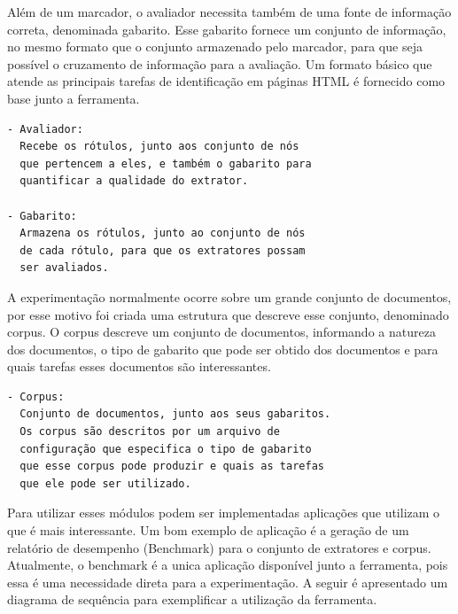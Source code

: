 \documentclass[12pt, a4paper]{article}
\begin{document}

Além de um marcador, o avaliador necessita também de uma fonte de
informação correta, denominada gabarito. Esse gabarito fornece um
conjunto de informação, no mesmo formato que o conjunto armazenado pelo
marcador, para que seja possível o cruzamento de informação para a
avaliação. Um formato básico que atende as principais tarefas de
identificação em páginas HTML é fornecido como base junto a ferramenta.

\begin{verbatim}
- Avaliador:
  Recebe os rótulos, junto aos conjunto de nós
  que pertencem a eles, e também o gabarito para
  quantificar a qualidade do extrator.

- Gabarito: 
  Armazena os rótulos, junto ao conjunto de nós
  de cada rótulo, para que os extratores possam
  ser avaliados.
\end{verbatim}


A experimentação normalmente ocorre sobre um grande conjunto de
documentos, por esse motivo foi criada uma estrutura que descreve esse
conjunto, denominado corpus. O corpus descreve um conjunto de
documentos, informando a natureza dos documentos, o tipo de gabarito que
pode ser obtido dos documentos e para quais tarefas esses documentos são
interessantes.

\begin{verbatim}
- Corpus: 
  Conjunto de documentos, junto aos seus gabaritos.
  Os corpus são descritos por um arquivo de
  configuração que especifica o tipo de gabarito
  que esse corpus pode produzir e quais as tarefas
  que ele pode ser utilizado.
\end{verbatim}

Para utilizar esses módulos podem ser implementadas aplicações que
utilizam o que é mais interessante. Um bom exemplo de aplicação
é a geração de um relatório de desempenho (Benchmark) para o conjunto de
extratores e corpus. Atualmente, o benchmark é a unica aplicação
disponível junto a ferramenta, pois essa é uma necessidade direta para a
experimentação. A seguir é apresentado um diagrama de sequência para
exemplificar a utilização da ferramenta.
\end{document}
